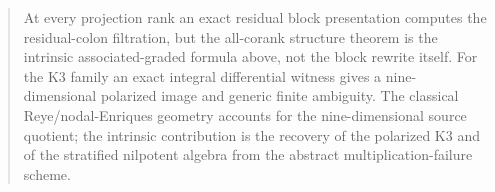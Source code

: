 \begin{abstract}
At every projection rank an exact residual block presentation computes
the residual-colon filtration, but the all-corank structure theorem is
the intrinsic associated-graded formula above, not the block rewrite
itself.  For the K3 family an
exact integral differential witness gives a nine-dimensional polarized
image and generic finite ambiguity.  The classical Reye/nodal-Enriques
geometry accounts for the nine-dimensional source quotient; the
intrinsic contribution is the recovery of the polarized K3 and of the
stratified nilpotent algebra from the abstract multiplication-failure
scheme.
\end{abstract}
\maketitle
